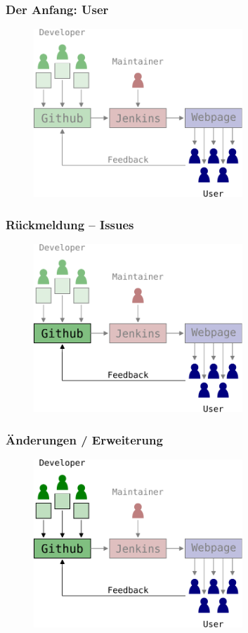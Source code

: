 \begin{frame}
	\frametitle{Der Anfang: User}
	\begin{figure}
		\centering
		\includegraphics[width=0.7\textwidth]{fig/fosa-loop-1.pdf}

	\end{figure}
\end{frame}

\begin{frame}
	\frametitle{Rückmeldung -- Issues}
	\begin{figure}
		\centering
		\includegraphics[width=0.7\textwidth]{fig/fosa-loop-2.pdf}

	\end{figure}
\end{frame}

\begin{frame}
	\frametitle{Änderungen / Erweiterung}
	\begin{figure}
		\centering
		\includegraphics[width=0.7\textwidth]{fig/fosa-loop-3.pdf}

	\end{figure}
\end{frame}

